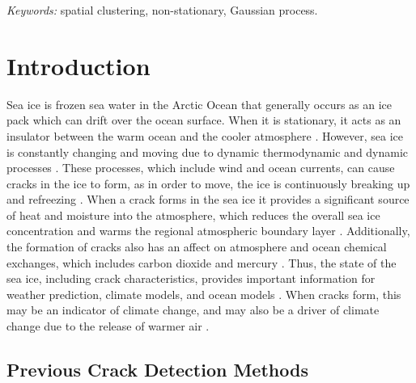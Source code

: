 \documentclass[12pt]{article}
\begin{document}
\noindent%
{\it Keywords:} spatial clustering, non-stationary, Gaussian process.
\vfill

\newpage
{} %

\hypertarget{introduction}{%
\section{Introduction}\label{introduction}}

Sea ice is frozen sea water in the Arctic Ocean that generally occurs as
an ice pack which can drift over the ocean surface. When it is
stationary, it acts as an insulator between the warm ocean and the
cooler atmosphere \citep{peterson_evaluating_2011}. However, sea ice is
constantly changing and moving due to dynamic thermodynamic and dynamic
processes \citep{hutter_leads_2019}. These processes, which include wind
and ocean currents, can cause cracks in the ice to form, as in order to
move, the ice is continuously breaking up and refreezing
\citep[\citet{hoffman_detection_2019}]{peterson_evaluating_2011}. When a
crack forms in the sea ice it provides a significant source of heat and
moisture into the atmosphere, which reduces the overall sea ice
concentration and warms the regional atmospheric boundary layer
\citep[\citet{reiser_new_2020}]{key_detectability_1993}. Additionally,
the formation of cracks also has an affect on atmosphere and ocean
chemical exchanges, which includes carbon dioxide and mercury
\citep{hoffman_detection_2019}. Thus, the state of the sea ice,
including crack characteristics, provides important information for
weather prediction, climate models, and ocean models
\citep{reiser_new_2020}. When cracks form, this may be an indicator of
climate change, and may also be a driver of climate change due to the
release of warmer air \citep{peterson_evaluating_2011}.

\hypertarget{previous-crack-detection-methods}{%
\subsection{Previous Crack Detection
Methods}\label{previous-crack-detection-methods}}
\end{document}
